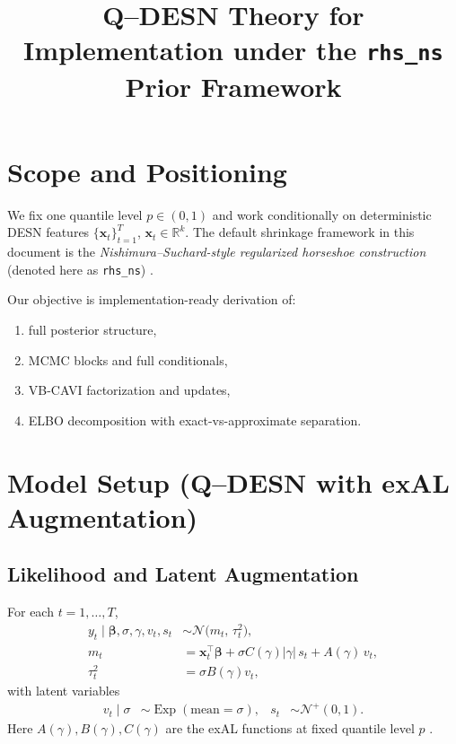 \documentclass[11pt]{article}
\title{Q--DESN Theory for Implementation under the \texttt{rhs\_ns} Prior Framework}
\author{}
\date{}
\newcommand{\R}{\mathbb{R}}
\newcommand{\N}{\mathcal{N}}
\newcommand{\TN}{\mathcal{N}^{+}}
\newcommand{\vect}[1]{\bm{#1}}
\DeclareMathOperator{\Exp}{Exp}
\begin{document}
\maketitle

\section{Scope and Positioning}
\label{sec:scope}

We fix one quantile level $p\in(0,1)$ and work conditionally on deterministic DESN features
$\{\vect{x}_t\}_{t=1}^T$, $\vect{x}_t\in\R^{k}$.
The default shrinkage framework in this document is the
\emph{Nishimura--Suchard-style regularized horseshoe construction} (denoted here as
\texttt{rhs\_ns}) \cite{nishimura-suchard,piironen-vehtari}.

Our objective is implementation-ready derivation of:
\begin{enumerate}[leftmargin=1.7em]
  \item full posterior structure,
  \item MCMC blocks and full conditionals,
  \item VB-CAVI factorization and updates,
  \item ELBO decomposition with exact-vs-approximate separation.
\end{enumerate}

\section{Model Setup (Q--DESN with exAL Augmentation)}
\label{sec:model}

\subsection{Likelihood and Latent Augmentation}

For each $t=1,\dots,T$,
\begin{align}
  y_t\mid\vect{\beta},\sigma,\gamma,v_t,s_t
  &\sim \N\!\Big(m_t,\,\tau_t^2\Big),
  \label{eq:y-cond}\\
  m_t
  &= \vect{x}_t^\top\vect{\beta}
     + \sigma C(\gamma)|\gamma|\,s_t
     + A(\gamma)\,v_t,
  \label{eq:mean-def}\\
  \tau_t^2
  &= \sigma B(\gamma) v_t,
  \label{eq:var-def}
\end{align}
with latent variables
\begin{align}
  v_t\mid\sigma &\sim \Exp(\text{mean}=\sigma),
  &
  s_t &\sim \TN(0,1).
\end{align}
Here $A(\gamma),B(\gamma),C(\gamma)$ are the exAL functions at fixed quantile level $p$ \cite{yan-exal}.
\end{document}
